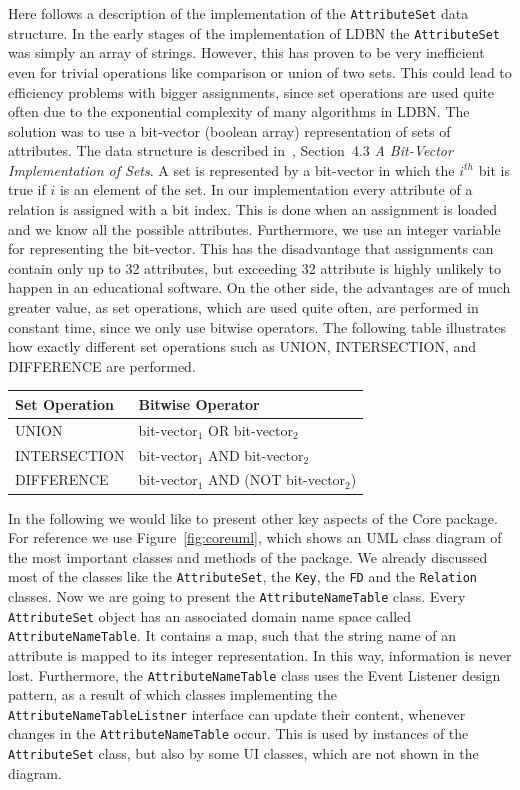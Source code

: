 Here follows a description of the implementation of the \verb=AttributeSet= data structure. 
In the early stages of the implementation of LDBN the \verb=AttributeSet=
was simply an array of strings. However, this has proven to be very
inefficient even for trivial operations like comparison or union of two sets. This could 
lead to efficiency problems with
bigger assignments, since set operations are used quite often due to the exponential
complexity of many algorithms in LDBN. 
The solution was to use a bit-vector (boolean array) representation of sets of attributes. The data structure is described 
in~\cite{AhoHU83dsabook}, Section~4.3 \textit{A Bit-Vector Implementation of Sets}. 
A set is represented by a bit-vector in which the $i^{th}$ bit is true if $i$ is an element of the set. In our
implementation every attribute of a relation is assigned with a bit index. This is
done when an assignment is loaded and
we know all the possible attributes. Furthermore, we use an integer variable for representing
the bit-vector. This has the disadvantage that
assignments can contain only up to 32 attributes, but exceeding 32 attribute 
is highly unlikely to happen in an educational software. On the other side, the 
advantages are of much greater value, as set operations, which are used quite 
often, are performed in constant time, since we only use bitwise operators. The following 
table illustrates how exactly different set operations such as 
UNION, INTERSECTION, and DIFFERENCE are performed.
 
\begin{center}
\begin{tabular}[h]{|l|l|}
\hline
Set Operation & Bitwise Operator \\
\hline
\hline
UNION        & bit-vector$_1$  OR  bit-vector$_2$ \\
INTERSECTION & bit-vector$_1$ AND  bit-vector$_2$ \\
DIFFERENCE   & bit-vector$_1$ AND (NOT bit-vector$_2$) \\
\hline
\end{tabular}
\end{center}

In the following we would like to present other key aspects of the Core package. For reference we 
use Figure~\ref{fig:coreuml}, which shows an UML class diagram of the most important 
classes and methods of the package. We already discussed most of the classes like the \verb=AttributeSet=,
the \verb=Key=, the \verb=FD= and the \verb=Relation= classes. Now we are going to present the  
\verb=AttributeNameTable= class. Every \verb=AttributeSet= object has an associated domain name space called 
\verb=AttributeNameTable=. It contains a map, such that the string name of an attribute is mapped to its 
integer representation. In this way, information is never lost. 
Furthermore, the \verb=AttributeNameTable=
class uses the Event Listener design pattern, as a result of which classes implementing 
the \verb=AttributeNameTableListner= interface can update their content,
whenever changes in the \verb=AttributeNameTable= occur. This is used by instances of the 
\verb=AttributeSet= class, but also by some UI classes, which are not shown in the diagram. 

